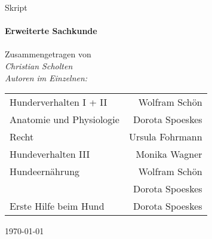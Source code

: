 \begin{titlepage}
\begin{center}
    \Large Skript\\
    \HRule \\
    { \huge \bfseries Erweiterte Sachkunde}\\
    \HRule \\
    Zusammengetragen von \\
    \emph{Christian Scholten} \\
    \vspace{5em}
    \emph{Autoren im Einzelnen:} \\
    \vspace{1em}
    \begin{tabular}{lr}
            Hunderverhalten I + II      & Wolfram Schön \\
            Anatomie und Physiologie    & Dorota Spoeskes \\
            Recht                       & Ursula Fohrmann \\
            Hundeverhalten III          & Monika Wagner \\
            Hundeernährung              & Wolfram Schön \\
                                        & Dorota Spoeskes \\
            Erste Hilfe beim Hund       & Dorota Spoeskes \\
    \end{tabular}
    \vfill
    {\large \today}

\end{center}
\end{titlepage}